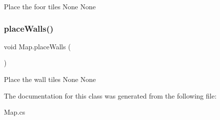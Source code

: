 Place the foor tiles  None  None \mbox{\label{class_map_a861230d1abdb5ed46e9dc95e8bf61d41}} 
\subsubsection{\texorpdfstring{place\+Walls()}{placeWalls()}}
{\footnotesize\ttfamily void Map.\+place\+Walls (\begin{DoxyParamCaption}{ }\end{DoxyParamCaption})\hspace{0.3cm}{\ttfamily [inline]}}

Place the wall tiles  None  None 

The documentation for this class was generated from the following file\+:\begin{DoxyCompactItemize}
\item 
Map.\+cs\end{DoxyCompactItemize}
